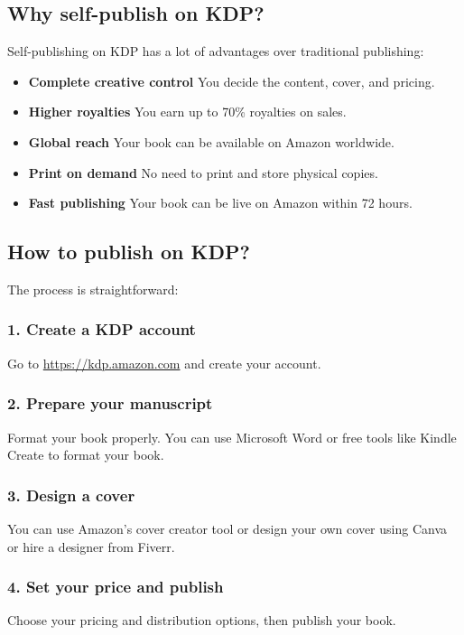 \documentclass[11pt]{article}
\begin{document}
\subsection*{Why self-publish on KDP?}
Self-publishing on KDP has a lot of advantages over traditional publishing:

\begin{itemize}
\item \textbf{Complete creative control} You decide the content, cover, and pricing.
\item \textbf{Higher royalties} You earn up to 70\% royalties on sales.
\item \textbf{Global reach} Your book can be available on Amazon worldwide.
\item \textbf{Print on demand} No need to print and store physical copies.
\item \textbf{Fast publishing} Your book can be live on Amazon within 72 hours.
\end{itemize}

\subsection*{How to publish on KDP?}
The process is straightforward:

\subsubsection*{1. Create a KDP account}
Go to \url{https://kdp.amazon.com} and create your account.

\subsubsection*{2. Prepare your manuscript}
Format your book properly. You can use Microsoft Word or free tools like Kindle Create to format your book.

\subsubsection*{3. Design a cover}
You can use Amazon's cover creator tool or design your own cover using Canva or hire a designer from Fiverr.

\subsubsection*{4. Set your price and publish}
Choose your pricing and distribution options, then publish your book.
\end{document}
